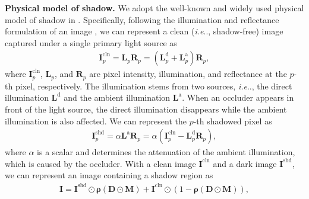 \documentclass[10pt,twocolumn,letterpaper]{article}
\makeatletter
\DeclareRobustCommand\onedot{\futurelet\@let@token\@onedot}
\def\@onedot{\ifx\@let@token.\else.\null\fi\xspace}
\def\ie{\emph{i.e}\onedot} \def\Ie{\emph{I.e}\onedot}
\renewcommand{\paragraph}[1]{\vspace{1.25mm}\noindent\textbf{#1}}
\makeatother
\begin{document}
\paragraph{Physical model of shadow.} 
%
We adopt the well-known and widely used physical model of shadow in \cite{shor2008the}. Specifically, following the illumination and reflectance formulation of an image \cite{shor2008the}, we can represent a clean (\ie, shadow-free) image captured under a single primary light source as
\begin{align}\label{eq:shadowfree_pixel}
\mathbf{I}_p^\text{cln}= \mathbf{L}_p \mathbf{R}_p = (\mathbf{L}^\mathrm{d}_p+\mathbf{L}^\mathrm{a}_p)\mathbf{R}_p,
\end{align}
where $\mathbf{I}_p^\text{cln}$, $\mathbf{L}_p$, and $\mathbf{R}_p$ are pixel intensity, illumination, and reflectance at the $p$-th pixel, respectively. The illumination stems from two sources, \ie, the direct illumination $\mathbf{L}^\mathrm{d}$ and the ambient illumination $\mathbf{L}^\mathrm{a}$. When an occluder appears in front of the light source, the direct illumination disappears while the ambient illumination is also affected. We can represent the $p$-th shadowed pixel as  
%
\begin{align}\label{eq:shadowed_pxiel}
\mathbf{I}_p^\text{shd}=\alpha\mathbf{L}^\mathrm{a}\mathbf{R}_p = \alpha(\mathbf{I}_p^\text{cln} - \mathbf{L}^\mathrm{d}_p\mathbf{R}_p),
\end{align}
%
where $\alpha$ is a scalar and determines the attenuation of the ambient illumination, which is caused by the occluder. With a clean image $\mathbf{I}^\text{cln}$ and a dark image $\mathbf{I}^\text{shd}$, we can represent an image containing a shadow region as
%
\begin{align}\label{eq:shadowed}
\mathbf{I}=\mathbf{I}^\text{shd}\odot\mathbf{\rho}(\mathbf{D}\odot\mathbf{M})+\mathbf{I}^\text{cln}\odot(1-\mathbf{\rho}(\mathbf{D}\odot\mathbf{M})),
\end{align}
\end{document}
